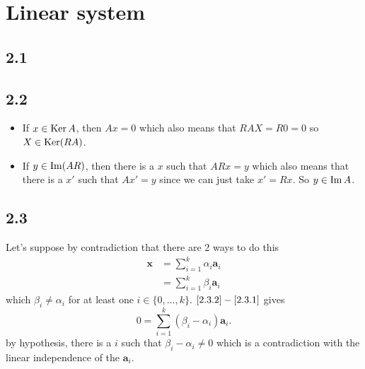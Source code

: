\section{Linear system}
\subsection*{2.1}
\nosolution

\subsection*{2.2}
\begin{solution}
  \begin{itemize}
    \item If $x \in \operatorname{Ker} A$, then $Ax = 0$
      which also means that $RAX = R0 = 0$ so $X \in \operatorname{Ker}(RA)$.
    \item If $y \in \operatorname{Im}(AR)$, then there is a $x$
      such that $ARx = y$
      which also means that there is a $x'$ such that
      $Ax' = y$ since we can just take $x' = Rx$.
      So $y \in \operatorname{Im} A$.
  \end{itemize}
\end{solution}

\subsection*{2.3}
\begin{solution}
  Let's suppose by contradiction that there are 2 ways
  to do this
  \begin{align}
    \label{eq:2.3.1}
    \mathbf{x} & = \sum_{i=1}^k \alpha_i \mathbf{a}_i\\
    \label{eq:2.3.2}
               & = \sum_{i=1}^k \beta_i \mathbf{a}_i
  \end{align}
  which $\beta_i \neq \alpha_i$ for at least one $i \in \{0, \ldots, k\}$.
  $\eqref{2.3.2}-\eqref{2.3.1}$ gives
  \[
    0 = \sum_{i=1}^k (\beta_i-\alpha_i) \mathbf{a}_i.
  \]
  by hypothesis, there is a $i$ such that $\beta_i-\alpha_i \neq 0$
  which is a contradiction with the linear independence of the $\mathbf{a}_i$.
\end{solution}

